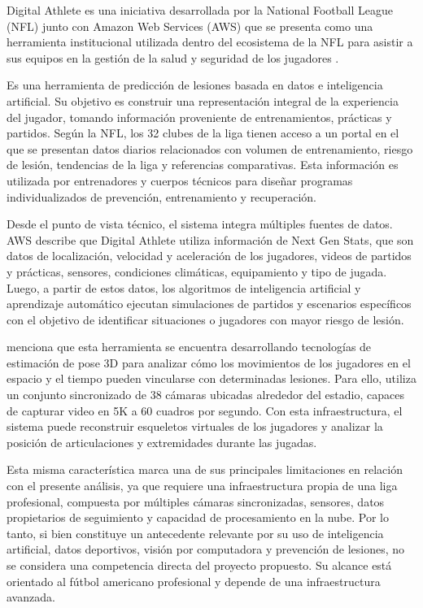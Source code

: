 Digital Athlete \parencite{NFLDigitalAthlete} es una iniciativa desarrollada por la National
Football League (NFL) junto con Amazon Web Services (AWS) que se presenta como una herramienta
institucional utilizada dentro del ecosistema de la NFL para asistir a sus equipos en la
gestión de la salud y seguridad de los jugadores \parencite{AWSNFL}.

Es una herramienta de predicción de lesiones basada en datos e inteligencia artificial. Su
objetivo es construir una representación integral de la experiencia del jugador, tomando
información proveniente de entrenamientos, prácticas y partidos. Según la NFL, los 32 clubes
de la liga tienen acceso a un portal en el que se presentan datos diarios relacionados con
volumen de entrenamiento, riesgo de lesión, tendencias de la liga y referencias comparativas.
Esta información es utilizada por entrenadores y cuerpos técnicos para diseñar programas
individualizados de prevención, entrenamiento y recuperación.

Desde el punto de vista técnico, el sistema integra múltiples fuentes de datos. AWS describe
que Digital Athlete utiliza información de Next Gen Stats, que son datos de localización,
velocidad y aceleración de los jugadores, videos de partidos y prácticas, sensores,
condiciones climáticas, equipamiento y tipo de jugada. Luego, a partir de estos datos, los
algoritmos de inteligencia artificial y aprendizaje automático ejecutan simulaciones de
partidos y escenarios específicos con el objetivo de identificar situaciones o jugadores con
mayor riesgo de lesión.

\textcite{AWSDigitalAthlete} menciona que esta herramienta se encuentra desarrollando
tecnologías de estimación de pose 3D para analizar cómo los movimientos de los jugadores en
el espacio y el tiempo pueden vincularse con determinadas lesiones. Para ello, utiliza un
conjunto sincronizado de 38 cámaras ubicadas alrededor del estadio, capaces de capturar video
en 5K a 60 cuadros por segundo. Con esta infraestructura, el sistema puede reconstruir
esqueletos virtuales de los jugadores y analizar la posición de articulaciones y extremidades
durante las jugadas.

Esta misma característica marca una de sus principales limitaciones en relación con el
presente análisis, ya que requiere una infraestructura propia de una liga profesional,
compuesta por múltiples cámaras sincronizadas, sensores, datos propietarios de seguimiento y
capacidad de procesamiento en la nube. Por lo tanto, si bien constituye un antecedente
relevante por su uso de inteligencia artificial, datos deportivos, visión por computadora y
prevención de lesiones, no se considera una competencia directa del proyecto propuesto. Su
alcance está orientado al fútbol americano profesional y depende de una infraestructura
avanzada.

